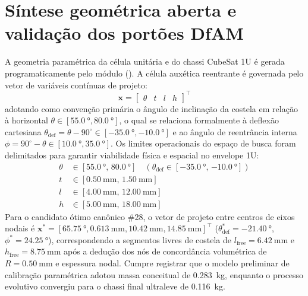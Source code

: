 \section{Síntese geométrica aberta e validação dos portões DfAM}
\label{sec:metod-dfam}

A geometria paramétrica da célula unitária e do chassi CubeSat 1U é gerada programaticamente pelo módulo  (). A célula auxética reentrante é governada pelo vetor de variáveis contínuas de projeto:
\begin{equation}
  \mathbf{x} = \begin{bmatrix} \theta & t & l & h \end{bmatrix}^{\top}
  \label{eq:vetor-x}
\end{equation}
adotando como convenção primária o ângulo de inclinação da costela em relação à horizontal $\theta \in [\SI{55.0}{\degree}, \SI{80.0}{\degree}]$, o qual se relaciona formalmente à deflexão cartesiana $\theta_{\text{def}} = \theta - 90^\circ \in [\SI{-35.0}{\degree}, \SI{-10.0}{\degree}]$ e ao ângulo de reentrância interna $\phi = 90^\circ - \theta \in [\SI{10.0}{\degree}, \SI{35.0}{\degree}]$. Os limites operacionais do espaço de busca foram delimitados para garantir viabilidade física e espacial no envelope 1U:
\begin{align*}
  \theta &\in [\SI{55.0}{\degree},\, \SI{80.0}{\degree}] \quad (\theta_{\text{def}} \in [\SI{-35.0}{\degree},\, \SI{-10.0}{\degree}]) \\
  t &\in [\SI{0.50}{\milli\metre},\, \SI{1.50}{\milli\metre}] \\
  l &\in [\SI{4.00}{\milli\metre},\, \SI{12.00}{\milli\metre}] \\
  h &\in [\SI{5.00}{\milli\metre},\, \SI{18.00}{\milli\metre}]
\end{align*}
Para o candidato ótimo canônico \#28, o vetor de projeto entre centros de eixos nodais é $\mathbf{x}^* = [\SI{65.75}{\degree}, \SI{0.613}{\milli\metre}, \SI{10.42}{\milli\metre}, \SI{14.85}{\milli\metre}]^\top$ ($\theta_{\text{def}}^* = \SI{-21.40}{\degree}$, $\phi^* = \SI{24.25}{\degree}$), correspondendo a segmentos livres de costela de $l_{\text{free}} = \SI{6.42}{\milli\metre}$ e $h_{\text{free}} = \SI{8.75}{\milli\metre}$ após a dedução dos nós de concordância volumétrica de $R = \SI{0.50}{\milli\metre}$ e espessura nodal. Cumpre registrar que o modelo preliminar de calibração paramétrica adotou massa conceitual de \SI{0.283}{\kilo\gram}, enquanto o processo evolutivo convergiu para o chassi final ultraleve de \SI{0.116}{\kilo\gram}.

